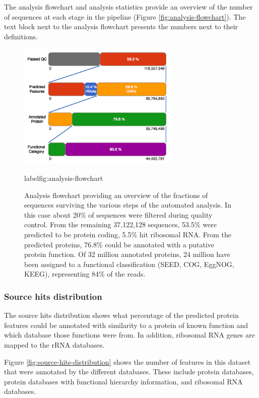\documentclass[12pt,fullpage]{report}
\begin{document}
The analysis flowchart and analysis statistics provide an overview of the number of sequences at each stage in the pipeline (Figure \ref{fig:analysis-flowchart}). The text block next to the analysis flowchart presents the numbers next to their definitions.
\begin{figure}
\begin{center}
\includegraphics[width=3in]{Images/analysis-flowchart.png}
\end{center}
\caption{
Analysis flowchart providing an overview of the fractions of sequences surviving the various steps of the automated analysis. In this case about 20\% of sequences were filtered during quality control. From the remaining 37,122,128 sequences, 53.5\% were predicted to be protein coding, 5.5\% hit ribosomal RNA. From the predicted proteins, 76.8\% could be annotated with a putative protein function. Of 32 million annotated proteins, 24 million have been assigned to a functional classification (\gls{SEED}, COG, EggNOG, KEEG), representing 84\% of the reads.
}
label{fig:analysis-flowchart}
\end{figure}

\subsubsection{Source hits distribution}
\label{section:source-hits-distribution}
The source hits distribution shows what percentage of the predicted protein features could be annotated with similarity to a protein of known function and which database those functions were from. In addition, ribosomal RNA genes are mapped to the rRNA databases.

Figure \ref{fig:source-hits-distribution} shows the number of features in this dataset that were annotated by the different databases. These include protein databases, protein databases with functional hierarchy information, and ribosomal RNA databases.
\end{document}
